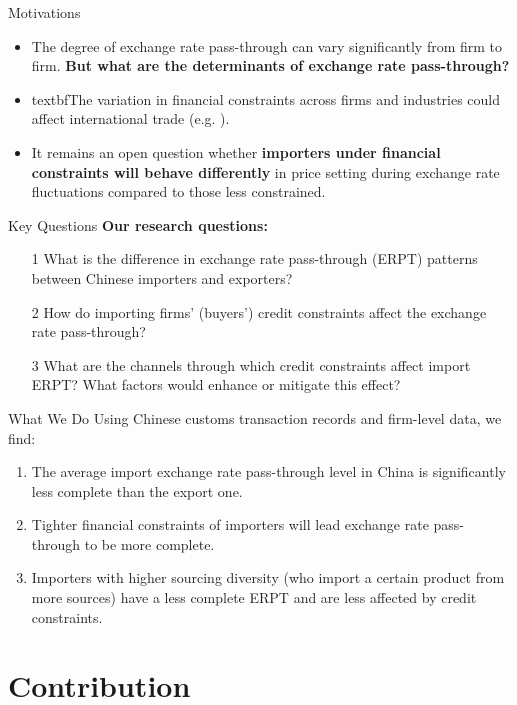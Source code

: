 \documentclass[10pt]{beamer}
\begin{document}
\begin{frame}{Motivations}
	\begin{itemize}
		\item The degree of exchange rate pass-through can vary significantly from firm to firm. \textbf{But what are the determinants of exchange rate pass-through?}
		\item textbf{The variation in financial constraints across firms and industries could affect international trade} (e.g. \cite{manova2013}).
		\item It remains an open question whether \textbf{importers under financial constraints will behave differently} in price setting during exchange rate fluctuations compared to those less constrained.
	\end{itemize}
\end{frame}

\begin{frame}{Key Questions}
\textbf{Our research questions:}
	\begin{itemize}
		\item [1] What is the difference in exchange rate pass-through (ERPT) patterns between Chinese importers and exporters?
		\item [2] How do importing firms' (buyers') credit constraints affect the exchange rate pass-through?
		\item [3] What are the channels through which credit constraints affect import ERPT? What factors would enhance or mitigate this effect?
	\end{itemize}
\end{frame}

\begin{frame}{What We Do}
Using Chinese customs transaction records and firm-level data, we find:	
	\begin{enumerate}
		\item The average import exchange rate pass-through level in China is significantly less complete than the export one.
		\item Tighter financial constraints of importers will lead exchange rate pass-through to be more complete.
		\item Importers with higher sourcing diversity (who import a certain product from more sources) have a less complete ERPT and are less affected by credit constraints.
	\end{enumerate}	
\end{frame}

\section{Contribution}
\end{document}
